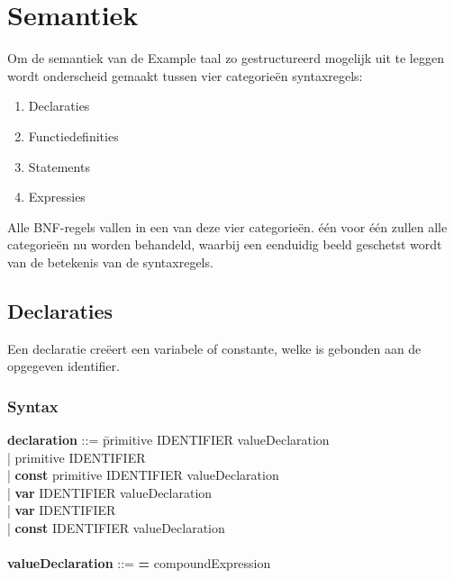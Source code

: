\chapter{Semantiek}
Om de semantiek van de Example taal zo gestructureerd mogelijk uit te leggen wordt onderscheid gemaakt tussen vier categorie\"{e}n syntaxregels:
\begin{enumerate}
\item Declaraties
\item Functiedefinities
\item Statements
\item Expressies
\end{enumerate}
Alle BNF-regels vallen in een van deze vier categorie\"{e}n. \'{e}\'{e}n voor \'{e}\'{e}n zullen alle categorie\"{e}n nu worden behandeld, waarbij een eenduidig beeld geschetst wordt van de betekenis van de syntaxregels.

\section{Declaraties}
Een declaratie cre\"{e}ert een variabele of constante, welke is gebonden aan de opgegeven identifier.
    \subsection{Syntax}    
        \begin{tabbing}
            {\bf declaration}         ::= \=primitive IDENTIFIER valueDeclaration\\
                                      \>| primitive IDENTIFIER\\
                                      \>| \textbf{const} primitive IDENTIFIER valueDeclaration\\
                                      \>| \textbf{var} IDENTIFIER valueDeclaration\\
                                      \>| \textbf{var} IDENTIFIER\\
                                      \>| \textbf{const} IDENTIFIER valueDeclaration\\
            \\
            {\bf valueDeclaration}    ::= \textbf{=} compoundExpression\\
        \end{tabbing}
